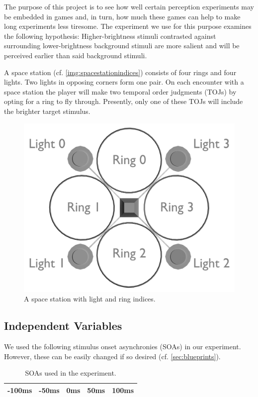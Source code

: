 \documentclass[11pt,a4paper]{article}
\begin{document}
    	The purpose of this project is to see how well certain perception experiments may be embedded in games and, in turn, how much these games can help to make long experiments less tiresome. The experiment we use for this purpose examines the following hypothesis: Higher-brightness stimuli contrasted against surrounding lower-brightness background stimuli are more salient and will be perceived earlier than said background stimuli.
        
        A space station (cf. \autoref{img:spacestationindices}) consists of four rings and four lights. Two lights in opposing corners form one pair. On each encounter with a space station the player will make two temporal order judgments (TOJs) by opting for a ring to fly through. Presently, only one of these TOJs will include the brighter target stimulus.
        
        \begin{figure}[h!tbp]
            \centering
            \includegraphics[width=.7\textwidth]{img/spacestation_indices}
            \caption{A space station with light and ring indices.}
            \label{img:spacestationindices}
        \end{figure}
        
        \subsection{Independent Variables}
        
        	We used the following stimulus onset asynchronies (SOAs) in our experiment. However, these can be easily changed if so desired (cf. \autoref{sec:blueprints}).
            \begin{table}[h!tbp]
            	\centering
           		\begin{tabular}{|l|l|l|l|l|} \hline
            		-100ms & -50ms & 0ms & 50ms & 100ms \\ \hline
            	\end{tabular}
                \caption{SOAs used in the experiment.}
                \label{tab:soas}
            \end{table}
            
\end{document}
